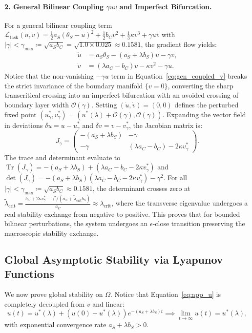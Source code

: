 \documentclass{article}
\theoremstyle{plain}
\theoremstyle{definition}
\DeclareMathOperator{\Tr}{Tr}
\begin{document}
\paragraph{2. General Bilinear Coupling $\gamma u v$ and Imperfect Bifurcation.}
For a general bilinear coupling term $\mathcal{L}_{\text{task}}(u, v) = \frac{1}{2} a_S (\theta_S - u)^2 + \frac{1}{2} b_C v^2 + \frac{1}{3} \kappa v^3 + \gamma u v$ with $|\gamma| < \gamma_{\text{max}} \coloneqq \sqrt{a_S b_C} = \sqrt{1.0 \times 0.025} \approx 0.1581$, the gradient flow yields:
\begin{align}
    \dot{u} &= a_S \theta_S - (a_S + \lambda b_S) u - \gamma v, \label{eq:gen_coupled_u} \\
    \dot{v} &= (\lambda a_C - b_C) v - \kappa v^2 - \gamma u. \label{eq:gen_coupled_v}
\end{align}
Notice that the non-vanishing $-\gamma u$ term in Equation~\eqref{eq:gen_coupled_v} breaks the strict invariance of the boundary manifold $\{v=0\}$, converting the sharp transcritical crossing into an imperfect bifurcation with an avoided crossing of boundary layer width $\mathcal{O}(\gamma)$. Setting $(\dot{u}, \dot{v}) = (0, 0)$ defines the perturbed fixed point $(u^*_\gamma, v^*_\gamma) = (u^*(\lambda) + \mathcal{O}(\gamma), \mathcal{O}(\gamma))$. Expanding the vector field in deviations $\delta u = u - u^*_\gamma$ and $\delta v = v - v^*_\gamma$, the Jacobian matrix is:
\begin{equation}
    J_\gamma = \begin{pmatrix}
        -(a_S + \lambda b_S) & -\gamma \\
        -\gamma & (\lambda a_C - b_C) - 2\kappa v^*_\gamma
    \end{pmatrix}.
\end{equation}
The trace and determinant evaluate to $\Tr(J_\gamma) = -(a_S + \lambda b_S) + (\lambda a_C - b_C - 2\kappa v^*_\gamma)$ and $\det(J_\gamma) = -(a_S + \lambda b_S)(\lambda a_C - b_C - 2\kappa v^*_\gamma) - \gamma^2$. For all $|\gamma| < \gamma_{\text{max}} \coloneqq \sqrt{a_S b_C} \approx 0.1581$, the determinant crosses zero at $\tilde{\lambda}_{\text{crit}} = \frac{b_C + 2\kappa v^*_\gamma - \gamma^2 / (a_S + \tilde{\lambda}_{\text{crit}} b_S)}{a_C} \approx \lambda_{\text{crit}}$, where the transverse eigenvalue undergoes a real stability exchange from negative to positive. This proves that for bounded bilinear perturbations, the system undergoes an $\epsilon$-close transition preserving the macroscopic stability exchange.
\subsection{Global Asymptotic Stability via Lyapunov Functions}
We now prove global stability on $\Omega$. Notice that Equation~\eqref{eq:app_u} is completely decoupled from $v$ and linear:
\begin{equation}
    u(t) = u^*(\lambda) + \left( u(0) - u^*(\lambda) \right) e^{-(a_S + \lambda b_S) t} \implies \lim_{t \to \infty} u(t) = u^*(\lambda),
\end{equation}
with exponential convergence rate $a_S + \lambda b_S > 0$.
\end{document}
